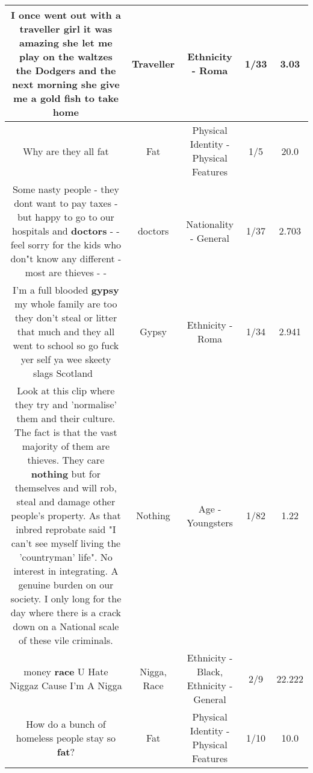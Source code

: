 \documentclass[11pt]{article}
\newlength\mylength
\begin{document}
\begin{center}
\begin{longtable}{|C{.65\mylength}|C{.30\mylength}|C{.12\mylength}|C{.12\mylength}|C{.12\mylength}|}
  \small I once went out with a \textbf{traveller} girl it was amazing she let me play on the waltzes the Dodgers and the next morning she give me a gold fish to take home\normalsize   & Traveller & Ethnicity - Roma & 1/33 & 3.03 \\  \hline
  \small Why are they all fat\normalsize   & Fat & Physical Identity - Physical Features & 1/5 & 20.0 \\  \hline
  \small Some nasty people -  they dont want to pay taxes -but happy to go to our hospitals and \textbf{doctors} -  - feel sorry for the kids who don"t know any different - most are thieves - -\normalsize   & doctors & Nationality - General & 1/37 & 2.703 \\  \hline
  \small I'm a full blooded \textbf{gypsy} my whole family are too they don't  steal or litter that much and they all went to school so go fuck yer self ya wee skeety slags Scotland 🏴󠁧󠁢󠁳󠁣󠁴󠁿\normalsize   & Gypsy & Ethnicity - Roma & 1/34 & 2.941 \\  \hline
  \small Look at this clip where they try and 'normalise' them and their culture. The fact is that the vast majority of them are thieves. They care \textbf{nothing} but for themselves and will rob, steal and damage other people's property. As that inbred reprobate said "I can't see myself living the 'countryman' life". No interest in integrating. A genuine burden on our society. I only long for the day where there is a crack down on a National scale of these vile criminals.\normalsize   & Nothing & Age - Youngsters & 1/82 & 1.22 \\  \hline
  \small money \textbf{race} U Hate Niggaz Cause I'm A Nigga\normalsize   & Nigga, Race & Ethnicity - Black, Ethnicity - General & 2/9 & 22.222 \\  \hline
  \small How do a bunch of homeless people stay so \textbf{fat}?\normalsize   & Fat & Physical Identity - Physical Features & 1/10 & 10.0 \\  \hline

\end{longtable}
\end{center}
\end{document}
